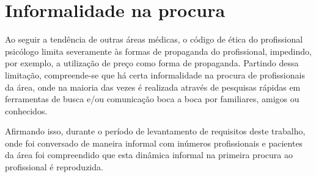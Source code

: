 \section{Informalidade na procura}
\label{sec:informalidadeNaProcura}

Ao seguir a tendência de outras áreas médicas, o código de ética do profissional psicólogo limita severamente às formas de propaganda do profissional, impedindo, por exemplo, a utilização de preço como forma de propaganda. Partindo dessa limitação, compreende-se que há certa informalidade na procura de profissionais da área, onde na maioria das vezes é realizada através de pesquisas rápidas em ferramentas de busca e/ou comunicação boca a boca por familiares, amigos ou conhecidos.

Afirmando isso, durante o período de levantamento de requisitos deste trabalho, onde foi conversado de maneira informal com inúmeros profissionais e pacientes da área foi compreendido que esta dinâmica informal na primeira procura ao profissional é reproduzida.